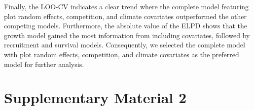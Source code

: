 Finally, the LOO-CV indicates a clear trend where the complete model
featuring plot random effects, competition, and climate covariates
outperformed the other competing models. Furthermore, the absolute value
of the ELPD shows that the growth model gained the most information from
including covariates, followed by recruitment and survival models.
Consequently, we selected the complete model with plot random effects,
competition, and climate covariates as the preferred model for further
analysis.\\

\newpage

\hypertarget{supplementary-material-2}{%
\section{Supplementary Material 2}\label{supplementary-material-2}}

